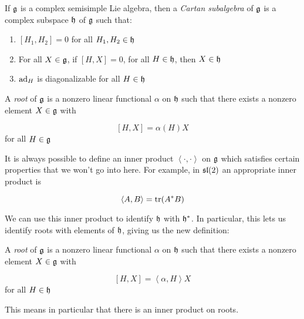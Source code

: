 \begin{defn}
    If $\mathfrak{g}$ is a complex semisimple Lie algebra, then a \emph{Cartan
        subalgebra} of $\mathfrak{g}$ is a complex subspace $\mathfrak{h}$ of
        $\mathfrak{g}$ such that: 
    \begin{enumerate}
        \renewcommand{\labelenumi}{\roman{enumi})}
        \item $\left[ H_1, H_2 \right] = 0$ for all $H_1, H_2 \in \mathfrak{h}$
        \item For all $X \in \mathfrak{g}$, if $\left[ H,X \right] = 0$, for all $H
            \in \mathfrak{h}$, then $X \in \mathfrak{h}$
        \item $\operatorname{ad}_H$ is diagonalizable for all $H \in \mathfrak{h}$
    \end{enumerate}
\end{defn}

\begin{defn}
A \emph{root} of $\mathfrak{g}$ is a nonzero linear functional $\alpha$ on $\mathfrak{h}$ such that there exists a nonzero element $X \in \mathfrak{g}$ with 

\begin{equation}
\left[ H,X \right] = \alpha(H)X
\end{equation}
for all $H \in \mathfrak{g}$
\end{defn}

It is always possible to define an inner product $\left<\cdot,\cdot\right>$ on
$\mathfrak{g}$ which satisfies certain properties that we won't go into here. For
example, in $\mathfrak{sl}(2)$ an appropriate inner product is 

\begin{equation}
\left<A,B\right> = \operatorname{tr}(A^*B)
\end{equation}

We can use this inner product to identify $\mathfrak{h}$ with $\mathfrak{h}^*$. In
particular, this lets us identify roots with elements of $\mathfrak{h}$, giving us
the new definition:

\begin{defn}
A \emph{root} of $\mathfrak{g}$ is a nonzero linear functional $\alpha$ on $\mathfrak{h}$
such that there exists a nonzero element $X \in \mathfrak{g}$ with 

\begin{equation}
\left[ H,X \right] = \left<\alpha,H\right>X
\end{equation}
for all $H \in \mathfrak{h}$
\end{defn}

This means in particular that there is an inner product on roots. 

